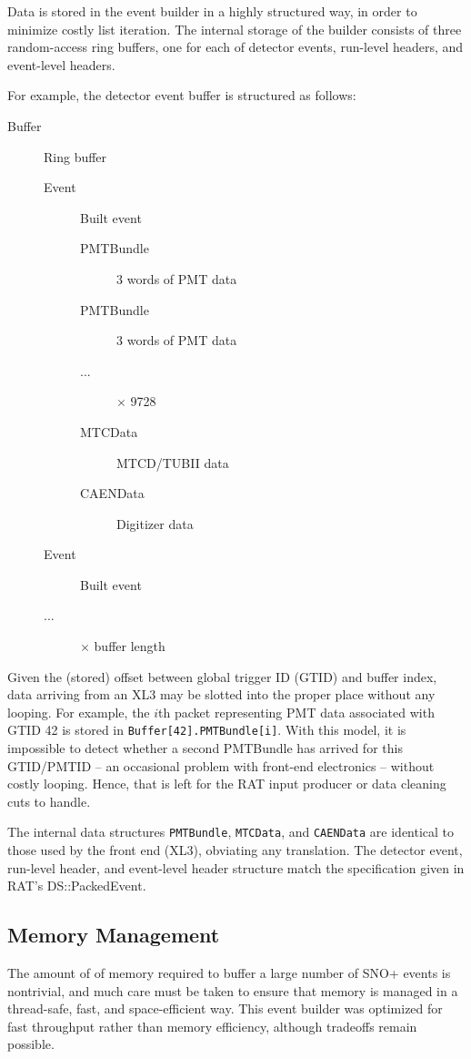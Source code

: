 \documentclass[11pt,twocolumn]{article}
\begin{document}
Data is stored in the event builder in a highly structured way, in order to minimize costly list iteration. The internal storage of the builder consists of three random-access ring buffers, one for each of detector events, run-level headers, and event-level headers.

For example, the detector event buffer is structured as follows:
\begin{description}
\item[Buffer] Ring buffer
\begin{description}
\item[Event] Built event
\begin{description}
\item[PMTBundle] 3 words of PMT data
\item[PMTBundle] 3 words of PMT data
\item[ ...] $\times$ 9728 
\item[MTCData] MTCD/TUBII data
\item[CAENData] Digitizer data
\end{description}
\item[Event] Built event
\item[...] $\times$ buffer length
\end{description}
\end{description}
Given the (stored) offset between global trigger ID (GTID) and buffer index, data arriving from an XL3 may be slotted into the proper place without any looping. For example, the $i$th packet representing PMT data associated with GTID 42 is stored in {\tt Buffer[42].PMTBundle[i]}. With this model, it is impossible to detect whether a second PMTBundle has arrived for this GTID/PMTID -- an occasional problem with front-end electronics -- without costly looping. Hence, that is left for the RAT input producer or data cleaning cuts to handle.

The internal data structures {\tt PMTBundle}, {\tt MTCData}, and {\tt CAENData} are identical to those used by the front end (XL3), obviating any translation. The detector event, run-level header, and event-level header structure match the specification given in RAT's DS::PackedEvent.

\subsection{Memory Management}
The amount of of memory required to buffer a large number of SNO+ events is nontrivial, and much care must be taken to ensure that memory is managed in a thread-safe, fast, and space-efficient way. This event builder was optimized for fast throughput rather than memory efficiency, although tradeoffs remain possible.
\end{document}
